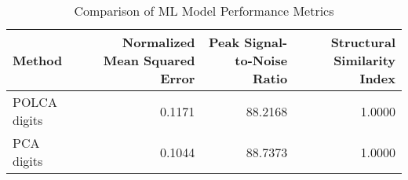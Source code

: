\begin{table}[htbp]
\caption{Comparison of ML Model Performance Metrics}
\label{tab:model_comparison}
\begin{tabular}{lrrr}
\toprule
Method & Normalized Mean Squared Error & Peak Signal-to-Noise Ratio & Structural Similarity Index \\
\midrule
POLCA digits & 0.1171 & 88.2168 & 1.0000 \\
PCA digits & 0.1044 & 88.7373 & 1.0000 \\
\bottomrule
\end{tabular}
\end{table}
